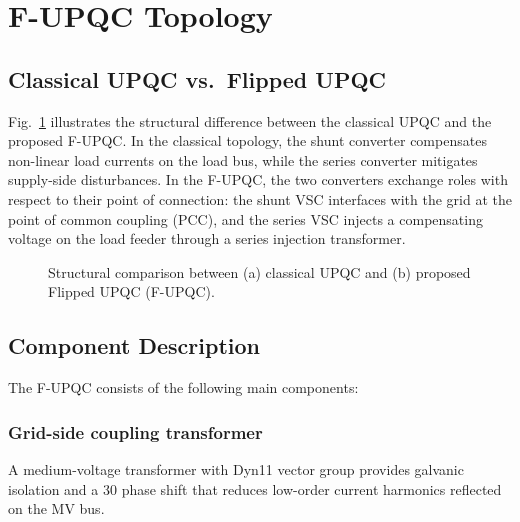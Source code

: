 \documentclass[conference]{IEEEtran}
\begin{document}

\section{F-UPQC Topology}
\label{sec:topology}

\subsection{Classical UPQC vs.\ Flipped UPQC}

Fig.~\ref{fig:comparison} illustrates the structural difference between
the classical UPQC and the proposed F-UPQC.
In the classical topology, the shunt converter compensates non-linear
load currents on the load bus, while the series converter mitigates
supply-side disturbances.
In the F-UPQC, the two converters exchange roles with respect to their
point of connection: the shunt VSC interfaces with the grid at the
point of common coupling (PCC), and the series VSC injects a
compensating voltage on the load feeder through a series injection
transformer.

\begin{figure}[htbp]
  \centering
  \caption{Structural comparison between (a) classical UPQC and
           (b) proposed Flipped UPQC (F-UPQC).}
  \label{fig:comparison}
\end{figure}

\subsection{Component Description}

The F-UPQC consists of the following main components:

\subsubsection{Grid-side coupling transformer}
A medium-voltage transformer with Dyn11 vector group provides
galvanic isolation and a 30\textdegree{} phase shift that reduces
low-order current harmonics reflected on the MV bus.
\end{document}
